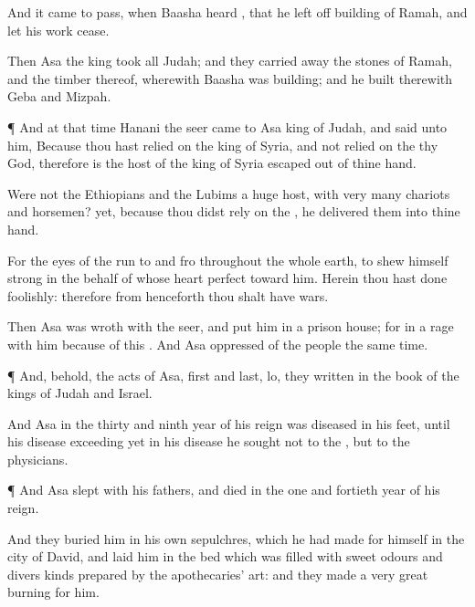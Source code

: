 {And it came to pass, when
Baasha
heard
{}, that he left
off
building of
Ramah, and let his
work
cease.

Then
Asa the
king
took all
Judah; and they carried
away the
stones of
Ramah, and the
timber thereof, wherewith
Baasha was
building; and he
built therewith
Geba and
Mizpah.


\par }{\PP {}¶ And at that
time
Hanani the
seer
came to
Asa
king of
Judah, and
said unto him, Because thou hast
relied on the
king of
Syria, and not
relied on the
{} thy
God, therefore is the
host of the
king of
Syria
escaped out of thine
hand.

Were not the
Ethiopians and the
Lubims a
huge
host, with
very
many
chariots and
horsemen? yet, because thou didst
rely on the
{}, he
delivered them into thine
hand.

For the
eyes of the
{} run to and
fro throughout the whole
earth, to shew himself
strong in the behalf of
{} whose
heart
{}
perfect toward him. Herein thou hast done
foolishly: therefore from
henceforth thou shalt
have
wars.

Then
Asa was
wroth with the
seer, and
put him in a
prison
house; for
{} in a
rage with him because of this
{}. And
Asa
oppressed
{} of the
people the same
time.


\par }{\PP {}¶ And, behold, the
acts of
Asa,
first and
last, lo, they
{}
written in the
book of the
kings of
Judah and
Israel.

And
Asa in the
thirty and
ninth
year of his
reign was
diseased in his
feet, until his
disease
{}
exceeding
{} yet in his
disease he
sought not to the
{}, but to the
physicians.


\par }{\PP {}¶ And
Asa
slept with his
fathers, and
died in the
one and
fortieth
year of his
reign.

And they
buried him in his own
sepulchres, which he had
made for himself in the
city of
David, and
laid him in the
bed which was
filled with sweet
odours and divers
kinds
{}
prepared by the
apothecaries’
art: and they
made a
very
great
burning for him.




}
